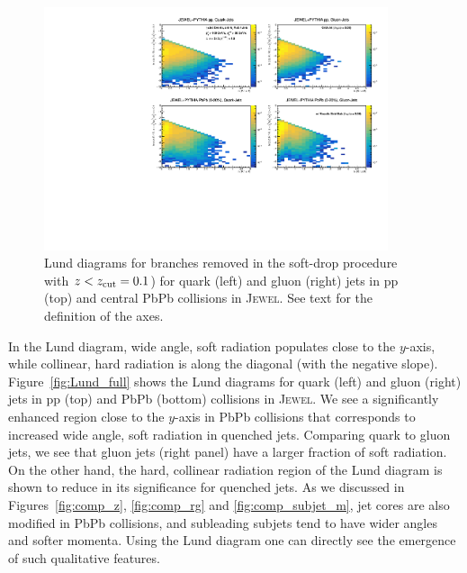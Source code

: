 \documentclass[notoc]{JHEP3}
\begin{document}
\begin{figure}[t]
	\centering
	\includegraphics[width=0.9\textwidth]{plots/Individual_LundDiagrams_zrel_background.pdf}
	\caption{Lund diagrams for branches removed in the soft-drop procedure with $z<z_{\rm cut}=0.1$) for quark (left) and gluon (right) jets in pp (top) and central PbPb collisions in \textsc{Jewel}. See text for the definition of the axes.}
\label{fig:Lund_bkg}
\end{figure}

In the Lund diagram, wide angle, soft radiation populates close to the $y$-axis, while collinear, hard radiation is along the diagonal (with the negative slope). Figure~\ref{fig:Lund_full} shows the Lund diagrams for quark (left) and gluon (right) jets in pp (top) and PbPb (bottom) collisions in \textsc{Jewel}. We see a significantly enhanced region close to the $y$-axis in PbPb collisions that corresponds to increased wide angle, soft radiation in quenched jets. Comparing quark to gluon jets, we see that gluon jets (right panel) have a larger fraction of soft radiation. On the other hand, the hard, collinear radiation region of the Lund diagram is shown to reduce in its significance for quenched jets. As we discussed in Figures~\ref{fig:comp_z}, \ref{fig:comp_rg} and \ref{fig:comp_subjet_m}, jet cores are also modified in PbPb collisions, and subleading subjets tend to have wider angles and softer momenta. Using the Lund diagram one can directly see the emergence of such qualitative features.
\end{document}
